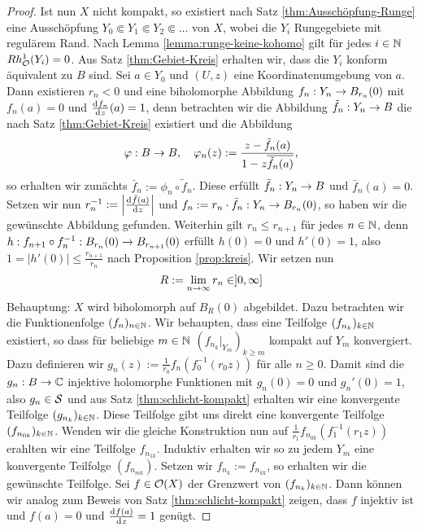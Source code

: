 \begin{proof}
  Ist nun $X$ nicht kompakt, so existiert nach Satz \ref{thm:Ausschöpfung-Runge}
  eine Ausschöpfung $Y_0 \Subset Y_1 \Subset Y_2 \Subset \dots $ von
  $X$, wobei die $Y_i$ Rungegebiete mit regulärem Rand. 
  Nach Lemma \ref{lemma:runge-keine-kohomo} gilt für jedes $i \in \N$
  $Rh_\hol^1(Y_i) = 0$.
  Aus Satz \ref{thm:Gebiet-Kreis} erhalten wir, dass die $Y_i$
  konform äquivalent zu $B$ sind. 
  Sei $a \in Y_0$ und $(U,z)$ eine Koordinatenumgebung von $a$. Dann
  existieren $r_n <0$ und eine biholomorphe Abbildung $f_n: Y_n \ra
  B_{r_n}(0)$ mit $f_n(a) = 0$ und $\frac{\d[f_n]}{\d[z]}(a) = 1$, denn
  betrachten wir die Abbildung $\tilde f_n : Y_n \ra B$ die nach
  Satz \ref{thm:Gebiet-Kreis} existiert und die Abbildung
  \[
  \phi: B \ra B, \quad\phi_n(z) := \frac{z- \tilde f_n(a)}{1 - z \overline{\tilde
      f_n(a)}},
  \]
  so erhalten wir zunächts $\bar f_n := \phi_n \circ \tilde
  f_n$. Diese erfüllt $\bar f_n : Y_n \ra B$ und $\bar f_n(a) =
  0$. Setzen wir nun $r_n^{-1} := \left | \frac{\d[\bar f(a)]}{\d[z]}
  \right |$ und $f_n := r_n \cdot \bar f_n : Y_n \ra B_{r_n}(0)$, so
  haben wir die gewünschte Abbildung gefunden. 
  Weiterhin gilt $r_n \leq r_{n+1}$ für jedes $n \in \N$, denn $h:
  f_{n+1} \circ f_n^{-1} : B_{r_n}(0) \ra B_{r_{n+1}}(0)$ erfüllt $h(0)=0$
  und $h'(0) = 1$, also $1 = |h'(0)| \leq \frac{r_{n+1}}{r_n}$ nach
  Proposition \ref{prop:kreis}. 
  Wir setzen nun
  \[
  R := \lim_{n \ra \infty} r_n \in ]0, \infty]
  \]
  Behauptung: $X$ wird biholomorph auf $B_R(0)$ abgebildet. Dazu
  betrachten wir die Funktionenfolge $(f_n)_{n \in \N}$. Wir
  behaupten, dass eine Teilfolge $(f_{n_k})_{k \in \N}$ existiert,
  so dass für beliebige $m \in \N$ $(f_{n_k}|_{Y_m})_{k \geq m}$
  kompakt auf $Y_m$ konvergiert. 
  Dazu definieren wir $g_n(z) := \frac{1}{r_0} f_n(f_0^{-1}(r_0 z))$
  für alle $n \geq 0$. Damit sind die $g_n : B \ra \C$ injektive
  holomorphe Funktionen mit $g_n(0) = 0$ und $g_n'(0) = 1$, also
  $g_n \in \S$ und aus Satz \ref{thm:schlicht-kompakt}
  erhalten wir eine konvergente Teilfolge $(g_{n_k})_{k \in\N}$.
  Diese Teilfolge gibt uns direkt eine konvergente Teilfolge
  $(f_{n_{0k}})_{k\in\N}$.
  Wenden wir die gleiche Konstruktion nun auf
  $\frac{1}{r_1}f_{n_{0k}}(f_1^{-1}(r_1z))$ erahlten wir eine
  Teilfolge $f_{n_{1k}}$. Induktiv erhalten wir so zu jedem $Y_m$
  eine konvergente Teilfolge $(f_{n_{mk}})$. 
  Setzen wir $f_{n_k} := f_{n_{kk}}$, so erhalten wir die gewünschte
  Teilfolge.
  Sei $f \in \hol(X)$ der Grenzwert von $(f_{n_k})_{k \in \N}$. Dann
  können wir analog zum Beweis von Satz \ref{thm:schlicht-kompakt}
  zeigen, dass $f$ injektiv ist und $f(a) = 0$ und
  $\frac{\d[f(a)]}{\d[z]} = 1$ genügt. 


\end{proof}
